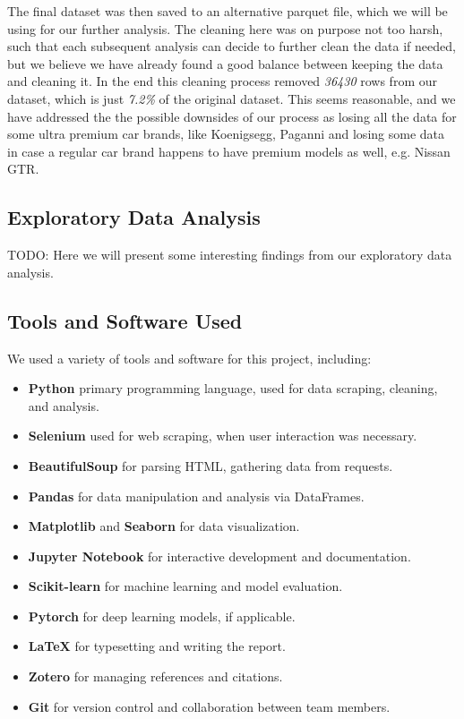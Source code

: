 \documentclass[12pt]{article}
\begin{document}
The final dataset was then saved to an alternative parquet file, which we will be using for our further analysis. The cleaning here was on purpose not too harsh, such that each subsequent analysis can decide to further clean the data if needed, but we believe we have already found a good balance between keeping the data and cleaning it.
In the end this cleaning process removed \textit{36430} rows from our dataset, which is just \textit{7.2\%} of the original dataset. This seems reasonable, and we have addressed the the possible downsides of our process as losing all the data for some ultra premium car brands, like Koenigsegg, Paganni and losing some data in case a regular car brand happens to have premium models as well, e.g. Nissan GTR.

\subsection{Exploratory Data Analysis}

TODO: Here we will present some interesting findings from our exploratory data analysis.

\subsection{Tools and Software Used}

We used a variety of tools and software for this project, including:

\begin{itemize}
  \item \textbf{Python} primary programming language, used for data scraping, cleaning, and analysis.
  \item \textbf{Selenium} used for web scraping, when user interaction was necessary.
  \item \textbf{BeautifulSoup} for parsing HTML, gathering data from requests.
  \item \textbf{Pandas} for data manipulation and analysis via DataFrames.
  \item \textbf{Matplotlib} and \textbf{Seaborn} for data visualization.
  \item \textbf{Jupyter Notebook} for interactive development and documentation.
  \item \textbf{Scikit-learn} for machine learning and model evaluation.
  \item \textbf{Pytorch} for deep learning models, if applicable.
  \item \textbf{LaTeX} for typesetting and writing the report.
  \item \textbf{Zotero} for managing references and citations.
  \item \textbf{Git} for version control and collaboration between team members.
\end{itemize}
\end{document}
